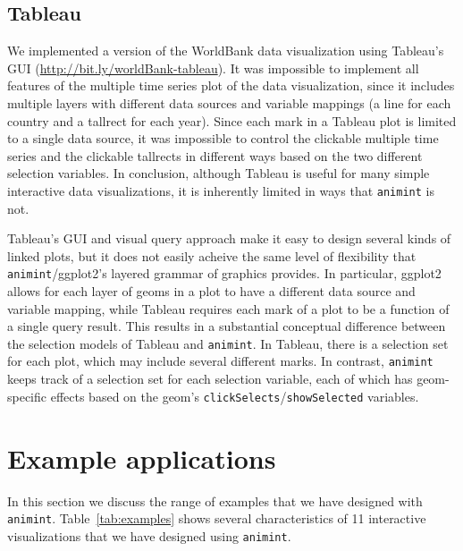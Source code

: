\documentclass[journal]{vgtc}\usepackage[]{graphicx}\usepackage[]{color}
\begin{document}
\subsection{Tableau}

We implemented a version of the WorldBank data visualization using
Tableau's GUI (\url{http://bit.ly/worldBank-tableau}).
It was impossible to implement all features of the multiple time
series plot of the data visualization, since it includes multiple
layers with different data sources and variable mappings (a line for
each country and a tallrect for each year). Since each mark in a
Tableau plot is limited to a single data source, it was impossible to
control the clickable multiple time series and the clickable tallrects
in different ways based on the two different selection variables. In
conclusion, although Tableau is useful for many simple interactive
data visualizations, it is inherently limited in ways that \texttt{animint} is not.

Tableau's GUI and visual query approach
make it easy to design several kinds of linked plots, but it does not
easily acheive the same level of flexibility that \texttt{animint}/ggplot2's
layered grammar of graphics provides. In particular, ggplot2 allows
for each layer of geoms in a plot to have a different data source and
variable mapping, while Tableau requires each mark of a plot to be a
function of a single query result. This results in a substantial
conceptual difference between the selection models of Tableau and
\texttt{animint}. In Tableau, there is a selection set for each plot, which may
include several different marks. In contrast, \texttt{animint} keeps track of a
selection set for each selection variable, each of which has
geom-specific effects based on the geom's \texttt{clickSelects}/\texttt{showSelected}
variables.


\section{Example applications}

In this section we discuss the range of examples that we have designed
with \texttt{animint}. Table~\ref{tab:examples} shows several characteristics
of 11 interactive visualizations that we have designed using
\texttt{animint}.
\end{document}
